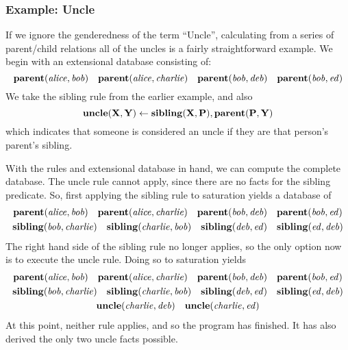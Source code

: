 \subsubsection{Example: Uncle}
If we ignore the genderedness of the term ``Uncle'', calculating from a series of parent/child relations all of the uncles is a fairly straightforward example.
We begin with an extensional database consisting of:
\[
        {\bf parent}({\it alice}, {\it bob})
        \quad {\bf parent}({\it alice}, {\it charlie})
        \quad {\bf parent}({\it bob}, {\it deb})
        \quad {\bf parent}({\it bob}, {\it ed})
\]
We take the sibling rule from the earlier example, and also
\[
        {\bf uncle}({\bf X}, {\bf Y}) \leftarrow {\bf sibling}({\bf X}, {\bf P}), {\bf parent}({\bf P}, {\bf Y})
\]
which indicates that someone is considered an uncle if they are that person's parent's sibling.

With the rules and extensional database in hand, we can compute the complete database.
The uncle rule cannot apply, since there are no facts for the sibling predicate.
So, first applying the sibling rule to saturation yields a database of
\begin{gather*}
        {\bf parent}({\it alice}, {\it bob})
        \quad {\bf parent}({\it alice}, {\it charlie})
        \quad {\bf parent}({\it bob}, {\it deb})
        \quad {\bf parent}({\it bob}, {\it ed})\\
        {\bf sibling}({\it bob}, {\it charlie})
        \quad {\bf sibling}({\it charlie}, {\it bob})
        \quad {\bf sibling}({\it deb}, {\it ed})
        \quad {\bf sibling}({\it ed}, {\it deb})
\end{gather*}
The right hand side of the sibling rule no longer applies, so the only option now is to execute the uncle rule.
Doing so to saturation yields
\begin{gather*}
        {\bf parent}({\it alice}, {\it bob})
        \quad {\bf parent}({\it alice}, {\it charlie})
        \quad {\bf parent}({\it bob}, {\it deb})
        \quad {\bf parent}({\it bob}, {\it ed})\\
        {\bf sibling}({\it bob}, {\it charlie})
        \quad {\bf sibling}({\it charlie}, {\it bob})
        \quad {\bf sibling}({\it deb}, {\it ed})
        \quad {\bf sibling}({\it ed}, {\it deb})\\
        {\bf uncle}({\it charlie}, {\it deb})
        \quad {\bf uncle}({\it charlie}, {\it ed})
\end{gather*}
At this point, neither rule applies, and so the program has finished.
It has also derived the only two uncle facts possible.
